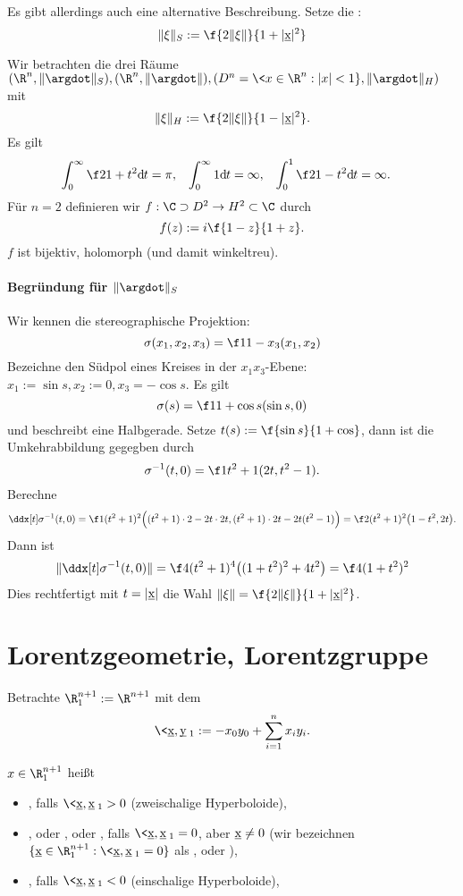 Es gibt allerdings auch eine alternative Beschreibung.
Setze die :
\[
	\|\xi\|_S := \f {2\|\xi\|}{1 + |\v x|^2}
\]

Wir betrachten die drei Räume $(\R^n, \|\argdot\|_S), (\R^n, \|\argdot\|), (D^n = \<x \in \R^n : |x| < 1 \}, \|\argdot\|_H)$
mit
\[
	\|\xi\|_H := \f {2\|\xi\|}{1 - |\v x|^2}.
\]
Es gilt
\begin{align*}
	\int_0^\infty \f 2{1+t^2} \dx[t] &= \pi, &
	\int_0^\infty 1 \dx[t] &= \infty, &
	\int_0^1 \f 2{1-t^2} \dx[t] &= \infty.
\end{align*}
Für $n=2$ definieren wir $f: \C \supset D^2 \to H^2 \subset \C$ durch
\[
	f(z) := i \f {1-z}{1+z}.
\]
$f$ ist bijektiv, holomorph (und damit winkeltreu).

\paragraph{Begründung für $\|\argdot\|_S$}

Wir kennen die stereographische Projektion:
\[
	\sigma(x_1, x_2, x_3) = \f 1{1-x_3} (x_1, x_2)
\]
Bezeichne den Südpol eines Kreises in der $x_1x_3$-Ebene: $x_1 := \sin s, x_2 := 0, x_3 = -\cos s$.
Es gilt
\[
	\sigma(s) = \f 1{1 + \cos s} (\sin s, 0)
\]
und beschreibt eine Halbgerade.
Setze $t(s) := \f {\sin s}{1 + \cos}$, dann ist die Umkehrabbildung gegegben durch
\[
	\sigma^{-1}(t, 0)
	= \f 1{t^2 + 1} (2t, t^2 - 1).
\]
Berechne
\[
	\ddx[t] \sigma^{-1}(t, 0)
	= \f 1{(t^2 + 1)^2} \Big( (t^2 + 1) \cdot 2 - 2t \cdot 2t, (t^2 + 1)\cdot 2t - 2t (t^2 - 1) \Big) \\
	= \f 2{(t^2 + 1)^2} \big( 1 - t^2, 2t \big).
\]
Dann ist
\[
	\| \ddx[t] \sigma^{-1} (t, 0) \|
	= \f 4{(t^2 + 1)^4} \big( (1+t^2)^2 + 4t^2 \big)
	= \f 4{(1+t^2)^2}
\]
Dies rechtfertigt mit $t = |\underbar{x}|$ die Wahl $\|\xi\| = \f {2\|\xi\|}{1 + |\v x|^2}$.


\section{Lorentzgeometrie, Lorentzgruppe}

Betrachte $\R_1^{n+1} := \R^{n+1}$ mit dem 
\[
	\< \v x, \v y \>_1 :=
	-x_0 y_0 + \sum_{i=1}^n x_i y_i.
\]

\begin{df}
	$x \in \R_1^{n+1}$ heißt
	\begin{itemize}
		\item
			, falls $\<\v x, \v x\>_1 > 0$ (zweischalige Hyperboloide),
		\item
			, oder , oder , falls $\<\v x, \v x\>_1 = 0$, aber $\underbar{x} \neq 0$ (wir bezeichnen $\{ \v x \in \R_1^{n+1} : \<\v x, \v x\>_1 = 0 \}$ als , oder ),
		\item
			, falls $\<\v x, \v x\>_1 < 0$ (einschalige Hyperboloide),
	\end{itemize}
\end{df}

